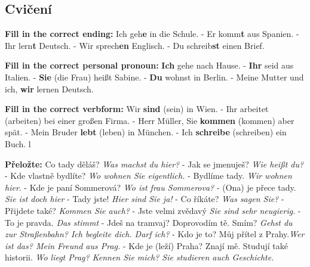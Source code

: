   \newpage
  \subsection*{Cvičení}
    \begin{example}\textbf{Fill in the correct ending:}\newline
      Ich geh\textbf{e} in die Schule. - Er komm\textbf{t} aus Spanien. - Ihr lern\textbf{t} 
      Deutsch. - Wir sprech\textbf{en} Englisch. - Du schreib\textbf{st} einen Brief.
    \end{example}

    \begin{example}\textbf{Fill in the correct personal pronoun:}\newline
     \textbf{Ich} gehe nach Hause. - \textbf{Ihr} seid aus Italien. - \textbf{Sie} (die Frau) 
     hei{\ss}t Sabine. - \textbf{Du} wohnst in Berlin. - Meine Mutter und ich, \textbf{wir} lernen 
     Deutsch.     
    \end{example}
    
    \begin{example}\textbf{Fill in the correct verbform:}\newline
      Wir \textbf{sind} (sein) in Wien. - Ihr arbeitet (arbeiten) bei einer gro{\ss}en Firma. - 
      Herr M{\"u}ller, Sie \textbf{kommen} (kommen) aber sp{\"a}t. - Mein Bruder \textbf{lebt} 
      (leben) in M{\"u}nchen. - Ich \textbf{schreibe} (schreiben) ein Buch. 
l    \end{example}

    \begin{example}\textbf{Přeložte:}\newline
      Co tady děláš? \emph{Was machst du hier?} - Jak se jmenuješ? \emph{Wie hei{\ss}t du?} - Kde 
      vlastně bydlíte? \emph{Wo wohnen Sie eigentlich.} - Bydlíme tady. \emph{Wir wohnen hier}. - 
      Kde je paní Sommerová? \emph{Wo ist frau Sommerova?} - (Ona) je přece tady. \emph{Sie ist 
      doch hier} - Tady jste! \emph{Hier sind Sie ja!} - Co říkáte? \emph{Was sagen Sie?} - 
      Přijdete také? \emph{Kommen Sie auch?} - Jste velmi zvědavý \emph{Sie sind sehr neugierig}. - 
      To je pravda. \emph{Das stimmt} - Jdeš na tramvaj? Doprovodím tě. Smím? \emph{Gehst du zur 
      Straßenbahn? Ich begleite dich. Darf ich?} - Kdo je to? Můj přítel z Prahy.\emph{Wer ist das? 
      Mein Freund aus Prag.} -  Kde je (leží) Praha? Znají mě. Studují také historii. \emph{Wo 
      liegt Prag? Kennen Sie mich? Sie studieren auch Geschichte.}
    \end{example}